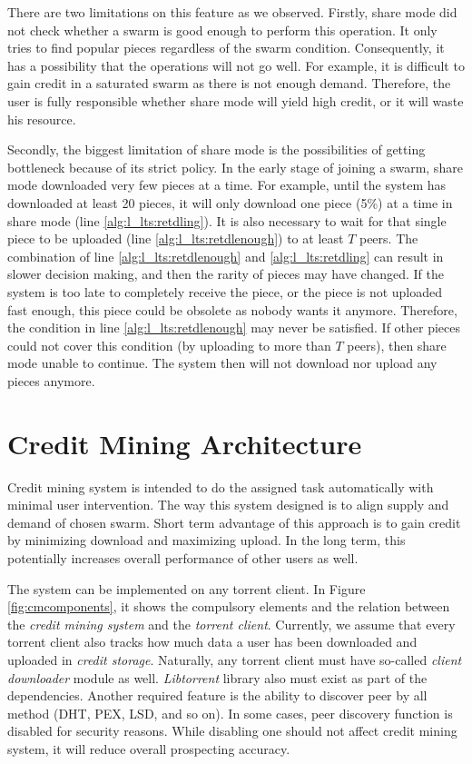 There are two limitations on this feature as we observed. Firstly, share mode did not check whether a swarm is good enough to perform this operation. It only tries to find popular pieces regardless of the swarm condition. Consequently, it has a possibility that the operations will not go well. For example, it is difficult to gain credit in a saturated swarm as there is not enough demand. Therefore, the user is fully responsible whether share mode will yield high credit, or it will waste his resource.

Secondly, the biggest limitation of share mode is the possibilities of getting bottleneck because of its strict policy. In the early stage of joining a swarm, share mode downloaded very few pieces at a time. For example, until the system has downloaded at least 20 pieces, it will only download one piece (5\%) at a time in share mode (line \ref{alg:l_lts:retdling}). It is also necessary to wait for that single piece to be uploaded (line \ref{alg:l_lts:retdlenough}) to at least $T$ peers. The combination of line \ref{alg:l_lts:retdlenough} and \ref{alg:l_lts:retdling} can result in slower decision making, and then the rarity of pieces may have changed. If the system is too late to completely receive the piece, or the piece is not uploaded fast enough, this piece could be obsolete as nobody wants it anymore. Therefore, the condition in line \ref{alg:l_lts:retdlenough} may never be satisfied. If other pieces could not cover this condition (by uploading to more than $T$ peers), then share mode unable to continue. The system then will not download nor upload any pieces anymore.

\section{Credit Mining Architecture}
\label{section:cmcomponents}

Credit mining system is intended to do the assigned task automatically with minimal user intervention. The way this system designed is to align supply and demand of chosen swarm. Short term advantage of this approach is to gain credit by minimizing download and maximizing upload. In the long term, this potentially increases overall performance of other users as well.

The system can be implemented on any torrent client. In Figure \ref{fig:cmcomponents}, it shows the compulsory elements and the relation between the \textit{credit mining system} and the \textit{torrent client}. Currently, we assume that every torrent client also tracks how much data a user has been downloaded and uploaded in \textit{credit storage}. Naturally, any torrent client must have so-called \textit{client downloader} module as well. \textit{Libtorrent} library also must exist as part of the dependencies. Another required feature is the ability to discover peer by all method (DHT, PEX, LSD, and so on). In some cases, peer discovery function is disabled for security reasons. While disabling one should not affect credit mining system, it will reduce overall prospecting accuracy.

